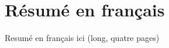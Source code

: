 \chapter*{Résumé en français}

Resumé en français ici (long, quatre pages)

\lipsum[1-20]


\endinput
